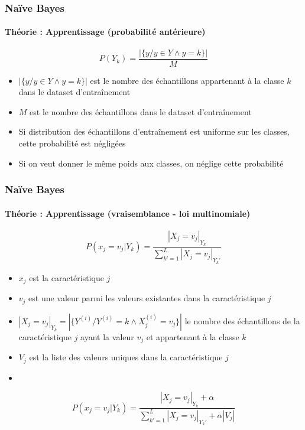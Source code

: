 \documentclass[xcolor=table]{beamer}
\begin{document}
\begin{frame}
	\frametitle{Naïve Bayes}
	\framesubtitle{Théorie : Apprentissage (probabilité antérieure)}
	
	\[P(Y_k) = \frac{|\{y / y \in Y \wedge y = k\}|}{M}\]
	
	\begin{itemize}
		\item $|\{y / y \in Y \wedge y = k\}|$ est le nombre des échantillons appartenant à la classe $k$ dans le dataset d'entraînement
		\item $M$ est le nombre des échantillons dans le dataset d'entraînement
		\item Si distribution des échantillons d'entraînement est uniforme sur les classes, cette probabilité est négligées 
		\item Si on veut donner le même poids aux classes, on néglige cette probabilité
	\end{itemize}
	
	
\end{frame}


\begin{frame}
	\frametitle{Naïve Bayes}
	\framesubtitle{Théorie : Apprentissage (vraisemblance - loi multinomiale)}
	
	\[P(x_j = v_j|Y_k) = \frac{|X_j = v_j|_{Y_k}}{\sum_{k'=1}^{L} |X_j = v_j|_{Y_k'}}\]
	
	\begin{itemize}
		\item $x_j$ est la caractéristique $j$
		\item $v_j$ est une valeur parmi les valeurs existantes dans la caractéristique $j$
		\item $|X_j = v_j|_{Y_k} = |\{Y^{(i)} / Y^{(i)} = k \wedge X^{(i)}_j = v_j\}|$ le nombre des échantillons de la caractéristique $j$ ayant la valeur $v_j$ et appartenant à la classe $k$
		\item $V_j$ est la liste des valeurs uniques dans la caractéristique $j$
		\item {}
	\end{itemize}

	\[P(x_j = v_j|Y_k) = \frac{|X_j = v_j|_{Y_k} + \alpha}{\sum_{k'=1}^{L} |X_j = v_j|_{Y_k'} + \alpha |V_j|}\]
	
	
\end{frame}
\end{document}
